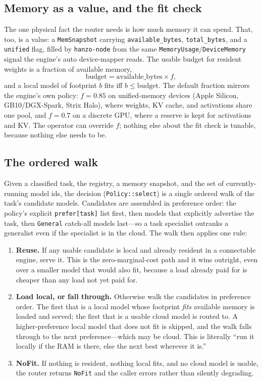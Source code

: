 \documentclass[11pt]{article}
\begin{document}
\subsection{Memory as a value, and the fit check}

The one physical fact the router needs is how much memory it can spend. That,
too, is a value: a \texttt{MemSnapshot} carrying \texttt{available\_bytes},
\texttt{total\_bytes}, and a \texttt{unified} flag, filled by \texttt{hanzo-node}
from the same \texttt{MemoryUsage}/\texttt{DeviceMemory} signal the engine's
auto device-mapper reads. The usable budget for resident weights is a fraction
of available memory,
\begin{equation}
\mathrm{budget} = \mathrm{available\_bytes}\times f,
\end{equation}
and a local model of footprint $b$ fits iff $b \le \mathrm{budget}$. The default
fraction mirrors the engine's own policy: $f=0.85$ on unified-memory devices
(Apple Silicon, GB10/DGX-Spark, Strix Halo), where weights, KV cache, and
activations share one pool, and $f=0.7$ on a discrete GPU, where a reserve is
kept for activations and KV. The operator can override $f$; nothing else about
the fit check is tunable, because nothing else needs to be.

\subsection{The ordered walk}

Given a classified task, the registry, a memory snapshot, and the set of
currently-running model ids, the decision (\texttt{Policy::select}) is a single
ordered walk of the task's candidate models. Candidates are assembled in
preference order: the policy's explicit \texttt{prefer[task]} list first, then
models that explicitly advertise the task, then \texttt{General} catch-all
models last---so a task specialist outranks a generalist even if the specialist
is in the cloud. The walk then applies one rule:

\begin{enumerate}
\item \textbf{Reuse.} If any usable candidate is local and already resident in a
connectable engine, serve it. This is the zero-marginal-cost path and it wins
outright, even over a smaller model that would also fit, because a load already
paid for is cheaper than any load not yet paid for.
\item \textbf{Load local, or fall through.} Otherwise walk the candidates in
preference order. The first that is a local model whose footprint \emph{fits}
available memory is loaded and served; the first that is a usable cloud model is
routed to. A higher-preference local model that does not fit is skipped, and the
walk falls through to the next preference---which may be cloud. This is
literally ``run it locally if the RAM is there, else the next best wherever it
is.''
\item \textbf{NoFit.} If nothing is resident, nothing local fits, and no cloud
model is usable, the router returns \texttt{NoFit} and the caller errors rather
than silently degrading.
\end{enumerate}
\end{document}
